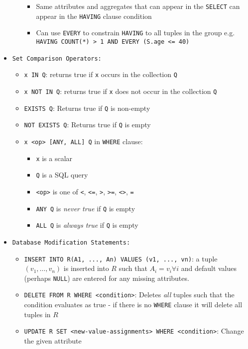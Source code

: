 \documentclass[landscape,8pt]{extarticle}
\newcommand{\code}{\lstinline}
\begin{document}
\begin{multicols}{4}
\begin{itemize}
\begin{itemize}
\begin{itemize}
        \item Same attributes and aggregates that can appear in the \code{SELECT} can appear in the
        \code{HAVING} clause condition
        \item Can use \code{EVERY} to constrain \code{HAVING} to all tuples in the group e.g. \code{HAVING COUNT(*) > 1 AND EVERY (S.age <= 40)}
    \end{itemize}
\end{itemize}
\item \code{Set Comparison Operators:}
\begin{itemize}
    \item \code{x IN Q}: returns true if \code{x} occurs in the collection \code{Q}
    \item \code{x NOT IN Q}: returns true if \code{x} does not occur in the collection \code{Q}
    \item \code{EXISTS Q}: Returns true if \code{Q} is non-empty
    \item \code{NOT EXISTS Q}: Returns true if \code{Q} is empty
    \item \code{x <op> [ANY, ALL] Q} in \code{WHERE} clause:
    \begin{itemize}
        \item \code{x} is a scalar
        \item \code{Q} is a SQL query
        \item \code{<op>} is one of \code{<}, \code{<=}, \code{>}, \code{>=}, \code{<>}, \code{=} 
        \item \code{ANY Q} is \emph{never true} if \code{Q} is empty
        \item \code{ALL Q} is \emph{always true} if \code{Q} is empty
    \end{itemize}
\end{itemize}
\item \code{Database Modification Statements:}
\begin{itemize}
    \item \code{INSERT INTO R(A1, ..., An) VALUES (v1, ..., vn)}: a tuple $(v_1, \ldots, v_n)$ is
    inserted into $R$ such that $A_i = v_i \forall i$ and default values (perhaps \code{NULL}) are
    entered for any missing attributes.
    \item \code{DELETE FROM R WHERE <condition>}: Deletes \emph{all} tuples such that the condition
    evaluates as true - if there is no \code{WHERE} clause it will delete all tuples in $R$
    \item \code{UPDATE R SET <new-value-assignments> WHERE <condition>}: Change the given attribute

\end{itemize}
\end{itemize}
\end{multicols}
\end{document}
